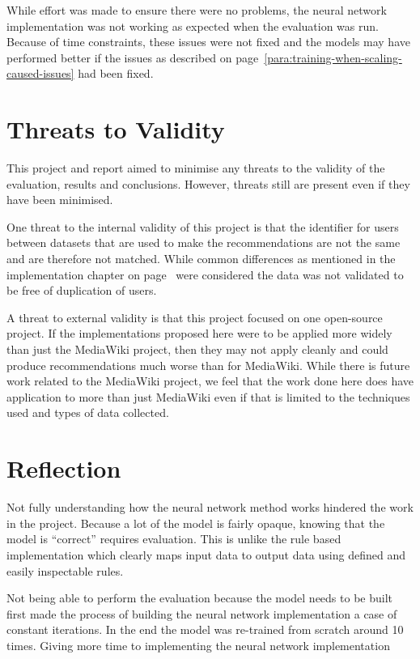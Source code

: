 While effort was made to ensure there were no problems, the neural network implementation was not working as expected when the evaluation was run. Because of time constraints, these issues were not fixed and the models may have performed better if the issues as described on page~\ref{para:training-when-scaling-caused-issues} had been fixed.

\section{Threats to Validity}
This project and report aimed to minimise any threats to the validity of the evaluation, results and conclusions. However, threats still are present even if they have been minimised.

One threat to the internal validity of this project is that the identifier for users between datasets that are used to make the recommendations are not the same and are therefore not matched. While common differences as mentioned in the implementation chapter on page~\pageref{para:de-duplication-supporting-code} were considered the data was not validated to be free of duplication of users.

A threat to external validity is that this project focused on one open-source project. If the implementations proposed here were to be applied more widely than just the MediaWiki project, then they may not apply cleanly and could produce recommendations much worse than for MediaWiki. While there is future work related to the MediaWiki project, we feel that the work done here does have application to more than just MediaWiki even if that is limited to the techniques used and types of data collected.

\section{Reflection}

Not fully understanding how the neural network method works hindered the work in the project. Because a lot of the model is fairly opaque, knowing that the model is ``correct'' requires evaluation. This is unlike the rule based implementation which clearly maps input data to output data using defined and easily inspectable rules.

Not being able to perform the evaluation because the model needs to be built first made the process of building the neural network implementation a case of constant iterations. In the end the model was re-trained from scratch around 10 times. Giving more time to implementing the neural network implementation

